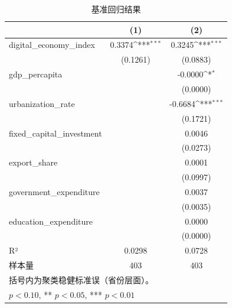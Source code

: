 \begin{table}[htbp]
\centering
\caption{基准回归结果}
\label{tab:main}
\def\sym#1{\ifmmode^{#1}\else\(^{#1}\)\fi}
\begin{tabular}{lcc}
\toprule
 & (1) & (2) \\
\midrule
digital\_economy\_index & 0.3374\sym{***} & 0.3245\sym{***} \\
  & (0.1261) & (0.0883) \\
gdp\_percapita &  & -0.0000\sym{*} \\
  &  & (0.0000) \\
urbanization\_rate &  & -0.6684\sym{***} \\
  &  & (0.1721) \xed\_capital\_investment &  & 0.0046 \\
  &  & (0.0273) \\
export\_share &  & 0.0001 \\
  &  & (0.0997) \\
government\_expenditure &  & 0.0037 \\
  &  & (0.0035) \\
education\_expenditure &  & 0.0000 \\
  &  & (0.0000) \\
\midrule
R² & 0.0298 & 0.0728 \\
样本量 & 403 & 403 \\
\bottomrule
\multicolumn{3}{l}{\footnotesize 括号内为聚类稳健标准误（省份层面）。}\\
\multicolumn{3}{l}{\footnotesize * $p<0.10$, ** $p<0.05$, *** $p<0.01$}\\
\end{tabular}
\end{table}